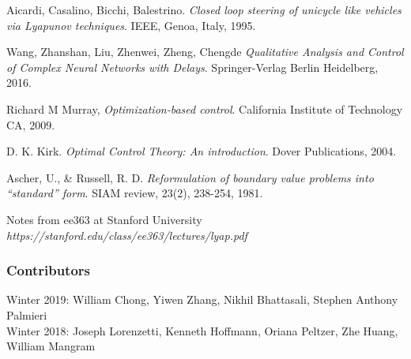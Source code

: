 \documentclass[twoside]{article}
\begin{document}
\begin{thebibliography}{9}
Aicardi, Casalino, Bicchi, Balestrino.
\textit{Closed loop steering of unicycle like vehicles via Lyapunov techniques}.
IEEE, Genoa, Italy, 1995.


Wang, Zhanshan, Liu, Zhenwei, Zheng, Chengde
\textit{Qualitative Analysis and Control of Complex Neural Networks with Delays}.
Springer-Verlag Berlin Heidelberg,  2016.


Richard M Murray, \textit{Optimization-based control}. California Institute of Technology CA, 2009.

D. K. Kirk. \textit{Optimal Control Theory: An introduction}. Dover Publications, 2004.

Ascher, U., \& Russell, R. D. \textit{Reformulation of boundary value problems into ``standard'' form}. SIAM review, 23(2), 238-254, 1981.

Notes from ee363 at Stanford University
\textit{https://stanford.edu/class/ee363/lectures/lyap.pdf}

\end{thebibliography}

\subsubsection*{Contributors}
Winter 2019: William Chong, Yiwen Zhang, Nikhil Bhattasali, Stephen Anthony Palmieri
\\
Winter 2018: Joseph Lorenzetti, Kenneth Hoffmann, Oriana Peltzer, Zhe Huang, William Mangram
\end{document}
